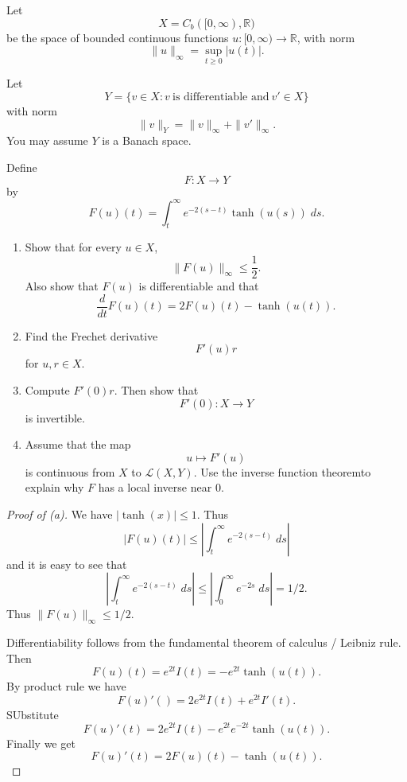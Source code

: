 \begin{prob}
    Let 
    \[
        X = C_b([0,\infty), \mathbb R)
    \]
    be the space of bounded continuous functions 
    $u : [0,\infty) \to \mathbb R$, with norm 
    \[
        \|u\|_\infty = \sup_{t\geq 0} |u(t)|. 
    \]

    Let 
    \[
        Y = \{v \in X : v \ \text{is differentiable and} \ 
        v' \in X\} 
    \]
    with norm 
    \[
        \|v\|_Y = \|v\|_\infty + \|v'\|_\infty. 
    \]
    You may assume $Y$ is a Banach space. 

    Define 
    \[
        F : X \to Y
    \]
    by 
    \[
        F(u)(t) = \int_t^\infty e^{-2(s-t)}\tanh(u(s))\;ds.
    \]

    \begin{enumerate}[label=\alph*)]
        \item Show that for every $u \in X$, 
            \[
                \|F(u)\|_\infty \leq \frac{1}{2}.
            \]
            Also show that $F(u)$ is differentiable and 
            that 
            \[
                \frac{d}{dt} F(u)(t) = 2F(u)(t) - \tanh(u(t)). 
            \]
        \item Find the Frechet derivative 
            \[
                F'(u)r 
            \]
            for $u,r \in X$. 
        \item Compute $F'(0)r$. Then show that 
            \[
                F'(0) : X \to Y
            \]
            is invertible. 
        \item Assume that the map 
            \[
                u\mapsto F'(u)
            \]
            is continuous from $X$ to $\mathcal L(X,Y)$. 
            Use the inverse function theoremto explain why 
            $F$ has a local inverse near $0$.
    \end{enumerate}
\end{prob}
\begin{proof}[Proof of (a)]
    We have $|\tanh(x)| \leq 1$. 
    Thus 
    \[
        |F(u)(t)| 
        \leq 
        \left|\int_t^\infty e^{-2(s-t)} \; ds\right| 
    \]
    and it is easy to see that 
    \[
        \left|\int_t^\infty e^{-2(s-t)} \; ds\right| 
        \leq 
        \left|\int_0^\infty e^{-2s} \; ds\right| = 1/2.
    \]
    Thus $\|F(u)\|_\infty \leq 1/2$. 
    
    Differentiability follows from the fundamental theorem 
    of calculus / Leibniz rule. Then 
    \[
        F(u)(t) = e^{2t}I(t) 
        = -e^{2t}\tanh(u(t)). 
    \]
    By product rule we have 
    \[
        F(u)'() = 2e^{2t}I(t) + e^{2t}I'(t). 
    \]
    SUbstitute  
    \[
        F(u)'(t) = 2e^{2t}I(t) -e^{2t}e^{-2t}\tanh(u(t)). 
    \]
    Finally we get 
    \[
        F(u)'(t) = 2F(u)(t) - \tanh(u(t)). 
    \]
\end{proof}

